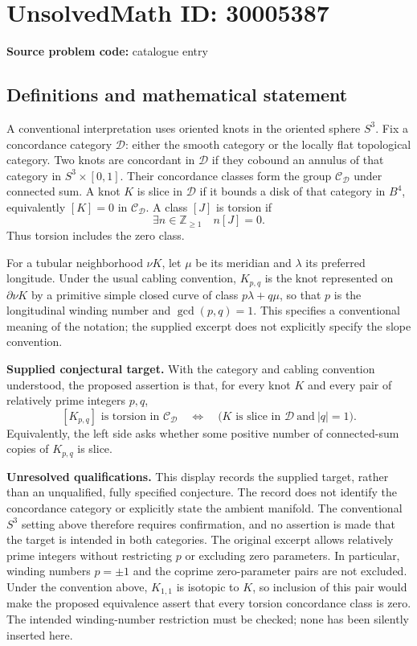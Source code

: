 \documentclass[11pt]{article}
\newcommand{\Z}{\mathbb{Z}}
\begin{document}
\section*{UnsolvedMath ID: 30005387}
\textbf{Source problem code:} catalogue entry
\subsection{Definitions and mathematical statement}
A conventional interpretation uses oriented knots in the oriented sphere $S^3$. Fix a concordance category $\mathcal D$: either the smooth category or the locally flat topological category. Two knots are concordant in $\mathcal D$ if they cobound an annulus of that category in $S^3\times[0,1]$. Their concordance classes form the group $\mathcal C_{\mathcal D}$ under connected sum. A knot $K$ is slice in $\mathcal D$ if it bounds a disk of that category in $B^4$, equivalently $[K]=0$ in $\mathcal C_{\mathcal D}$. A class $[J]$ is torsion if
\[
\exists n\in\Z_{\geq 1}\quad n[J]=0.
\]
Thus torsion includes the zero class.

For a tubular neighborhood $\nu K$, let $\mu$ be its meridian and $\lambda$ its preferred longitude. Under the usual cabling convention, $K_{p,q}$ is the knot represented on $\partial\nu K$ by a primitive simple closed curve of class $p\lambda+q\mu$, so that $p$ is the longitudinal winding number and $\gcd(p,q)=1$. This specifies a conventional meaning of the notation; the supplied excerpt does not explicitly specify the slope convention.

\textbf{Supplied conjectural target.} With the category and cabling convention understood, the proposed assertion is that, for every knot $K$ and every pair of relatively prime integers $p,q$,
\[
[K_{p,q}]\text{ is torsion in }\mathcal C_{\mathcal D}
\quad\Longleftrightarrow\quad
\bigl(K\text{ is slice in }\mathcal D\ \text{and}\ |q|=1\bigr).
\]
Equivalently, the left side asks whether some positive number of connected-sum copies of $K_{p,q}$ is slice.

\textbf{Unresolved qualifications.} This display records the supplied target, rather than an unqualified, fully specified conjecture. The record does not identify the concordance category or explicitly state the ambient manifold. The conventional $S^3$ setting above therefore requires confirmation, and no assertion is made that the target is intended in both categories. The original excerpt allows relatively prime integers without restricting $p$ or excluding zero parameters. In particular, winding numbers $p=\pm1$ and the coprime zero-parameter pairs are not excluded. Under the convention above, $K_{1,1}$ is isotopic to $K$, so inclusion of this pair would make the proposed equivalence assert that every torsion concordance class is zero. The intended winding-number restriction must be checked; none has been silently inserted here.
\end{document}
